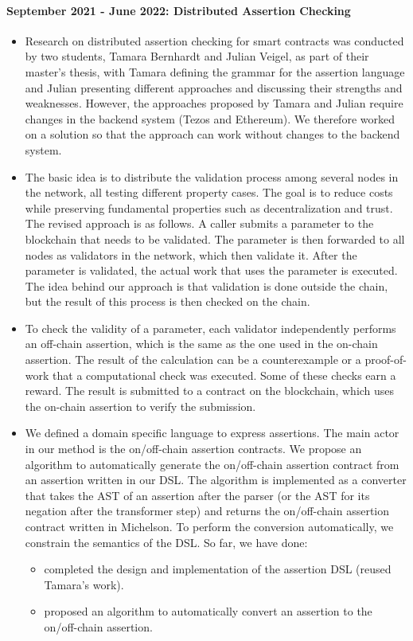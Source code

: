 \documentclass[a4paper,11pt]{article}
\begin{document}
\paragraph{September 2021 - June 2022: Distributed  Assertion Checking}
\begin{itemize}
\item Research on distributed assertion checking for smart contracts was conducted by two students, Tamara Bernhardt and Julian Veigel, as part of their master's thesis, with Tamara defining the grammar for the assertion language and Julian presenting different approaches and discussing their strengths and weaknesses. However, the approaches proposed by Tamara and Julian require changes  in the backend system (Tezos and Ethereum). We therefore worked on a solution so that the approach can work without changes to the backend system.
\item 
The basic idea is to distribute the validation process among several nodes in the network, all testing different property cases. The goal is to reduce costs while preserving fundamental properties such as decentralization and trust. The revised approach is as follows. A caller submits a parameter to the blockchain that needs to be validated. The parameter is then forwarded to all nodes as validators in the network, which then validate it. After the parameter is validated, the actual work that uses the parameter is executed. The idea behind our approach is that validation is done outside the chain, but the result of this process is then checked on the chain. 
\item To check the validity of a parameter, each validator independently performs an off-chain assertion, which is the same as the one used in the on-chain assertion. The result of the calculation can be a counterexample or a proof-of-work that a  computational check was executed. Some of these checks earn a reward. The result is submitted to a contract on the blockchain, which uses the on-chain assertion to verify the submission.
\item We defined a domain specific language to express assertions. The main actor in our method is the on/off-chain assertion contracts. We propose an algorithm to automatically generate the on/off-chain assertion contract from an assertion written in our DSL. The algorithm is implemented as a converter that takes the AST of an assertion after the parser (or the AST for its negation after the transformer step) and returns the on/off-chain assertion contract written in Michelson. To perform the conversion automatically, we constrain the semantics of the DSL. So far, we have done:
\begin{itemize}
\item completed the design and implementation of the assertion DSL (reused Tamara's work).
\item proposed an algorithm to automatically convert an assertion to the on/off-chain assertion.
\end{itemize}
\end{itemize}  
\end{document}
